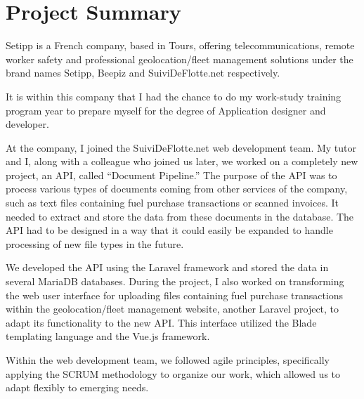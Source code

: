 \chapter{Project Summary}\label{ch:project-summary}


Setipp is a French company, based in Tours, offering telecommunications, remote worker safety and professional geolocation/fleet management solutions under the brand names Setipp, Beepiz and SuiviDeFlotte.net respectively.

It is within this company that I had the chance to do my work-study training program year to prepare myself for the degree of Application designer and developer.

At the company, I joined the SuiviDeFlotte.net web development team. My tutor and I, along with a colleague who joined us later, we worked on a completely new project, an API, called ``Document Pipeline.'' The purpose of the API was to process various types of documents coming from other services of the company, such as text files containing fuel purchase transactions or scanned invoices. It needed to extract and store the data from these documents in the database. The API had to be designed in a way that it could easily be expanded to handle processing of new file types in the future.

We developed the API using the Laravel framework and stored the data in several MariaDB databases. During the project, I also worked on transforming the web user interface for uploading files containing fuel purchase transactions within the geolocation/fleet management website, another Laravel project, to adapt its functionality to the new API. This interface utilized the Blade templating language and the Vue.js framework.

Within the web development team, we followed agile principles, specifically applying the SCRUM methodology to organize our work, which allowed us to adapt flexibly to emerging needs.